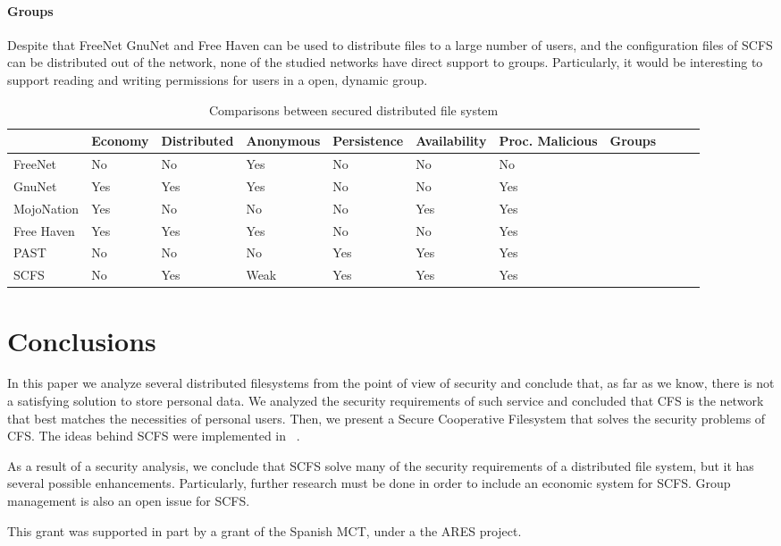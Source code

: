 \documentclass{llncs}
\begin{document}
\paragraph{Groups} Despite that FreeNet GnuNet and Free Haven can be used to distribute files to a large number of users, and the configuration files of SCFS can be distributed out of the network, none of the studied networks have direct support to groups. Particularly, it would be interesting to support reading and writing permissions for users in a open, dynamic group.

\begin{table}[t]%
	\centering%
\begin{tabular}{lllllllllll}
& Economy & Distributed & Anonymous & Persistence & Availability & Proc. Malicious & Groups \\\hline
FreeNet & No & No & Yes & No & No & No \\
GnuNet & Yes & Yes & Yes & No & No & Yes \\
MojoNation & Yes & No & No & No & Yes & Yes \\
Free Haven & Yes & Yes & Yes & No & No & Yes \\
PAST  & No & No & No & Yes & Yes & Yes \\
SCFS & No & Yes & Weak & Yes & Yes & Yes  \\
\end{tabular}
	\caption{Comparisons between secured distributed file system}%
	\label{tab:comparision}%
\end{table}

\section{Conclusions}

In this paper we analyze several distributed filesystems from the point of view of security and conclude that, as far as we know, there is not a satisfying solution to store personal data. We analyzed the security requirements of such service and concluded that CFS is the network that best matches the necessities of personal users. Then, we present a Secure Cooperative Filesystem that solves the security problems of CFS. The ideas behind SCFS were implemented in ~\cite{SCFS}.

As a result of a security analysis, we conclude that SCFS solve many of the security requirements of a distributed file system, but it has several possible enhancements. Particularly, further research must be done in order to include an economic system for SCFS. Group management is also an open issue for SCFS.

This grant was supported in part by a grant of the Spanish MCT, under a the ARES project.




%
\end{document}
